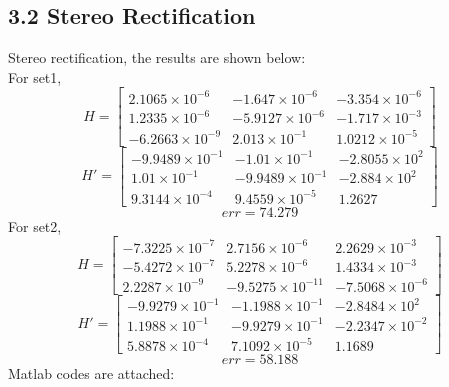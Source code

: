 \documentclass[letterpaper]{article}
\begin{document}
\subsection*{3.2 Stereo Rectification}
Stereo rectification, the results are shown below:\\
For set1,
$$H = 
\begin{bmatrix}
2.1065\times 10^{-6} & -1.647\times 10^{-6} & -3.354\times 10^{-6}\\
1.2335\times 10^{-6} & -5.9127\times 10^{-6} & -1.717\times 10^{-3}\\
-6.2663\times 10^{-9} & 2.013\times 10^{-1} & 1.0212\times 10^{-5}
\end{bmatrix}
$$
$$H' = 
\begin{bmatrix}
-9.9489\times 10^{-1} & -1.01\times 10^{-1} & -2.8055\times 10^{2}\\
1.01\times 10^{-1} & -9.9489\times 10^{-1} & -2.884\times 10^{2}\\
9.3144\times 10^{-4} & 9.4559\times 10^{-5} & 1.2627
\end{bmatrix}
$$
$$err = 74.279$$
For set2,
$$H = 
\begin{bmatrix}
-7.3225\times 10^{-7} & 2.7156\times 10^{-6} & 2.2629\times 10^{-3}\\
-5.4272\times 10^{-7} & 5.2278\times 10^{-6} & 1.4334\times 10^{-3}\\
2.2287\times 10^{-9} & -9.5275\times 10^{-11} & -7.5068\times 10^{-6}
 \end{bmatrix}
$$
$$H' = 
\begin{bmatrix}
-9.9279\times 10^{-1} & -1.1988\times 10^{-1} & -2.8484\times 10^{2}\\
1.1988\times 10^{-1} & -9.9279\times 10^{-1} & -2.2347\times 10^{-2}\\
5.8878\times 10^{-4} & 7.1092\times 10^{-5} & 1.1689 
\end{bmatrix}
$$
$$err = 58.188$$
Matlab codes are attached:



\end{document}
